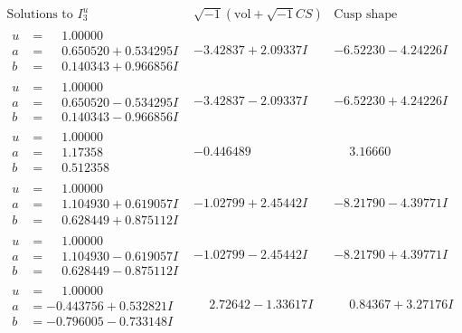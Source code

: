 \documentclass[1p]{elsarticle_modified}
\theoremstyle{definition}
\newcommand{\I}{\sqrt{-1}}
\begin{document}
$$\begin{array}{c|c|c}  
\text{Solutions to }I^u_{3}& \I (\text{vol} + \sqrt{-1}CS) & \text{Cusp shape}\\
 \hline 
\begin{aligned}
u &= \phantom{-}1.00000\phantom{ +0.000000I} \\
a &= \phantom{-}0.650520 + 0.534295 I \\
b &= \phantom{-}0.140343 + 0.966856 I\end{aligned}
 & -3.42837 + 2.09337 I & -6.52230 - 4.24226 I \\ \hline\begin{aligned}
u &= \phantom{-}1.00000\phantom{ +0.000000I} \\
a &= \phantom{-}0.650520 - 0.534295 I \\
b &= \phantom{-}0.140343 - 0.966856 I\end{aligned}
 & -3.42837 - 2.09337 I & -6.52230 + 4.24226 I \\ \hline\begin{aligned}
u &= \phantom{-}1.00000\phantom{ +0.000000I} \\
a &= \phantom{-}1.17358\phantom{ +0.000000I} \\
b &= \phantom{-}0.512358\phantom{ +0.000000I}\end{aligned}
 & -0.446489\phantom{ +0.000000I} & \phantom{-}3.16660\phantom{ +0.000000I} \\ \hline\begin{aligned}
u &= \phantom{-}1.00000\phantom{ +0.000000I} \\
a &= \phantom{-}1.104930 + 0.619057 I \\
b &= \phantom{-}0.628449 + 0.875112 I\end{aligned}
 & -1.02799 + 2.45442 I & -8.21790 - 4.39771 I \\ \hline\begin{aligned}
u &= \phantom{-}1.00000\phantom{ +0.000000I} \\
a &= \phantom{-}1.104930 - 0.619057 I \\
b &= \phantom{-}0.628449 - 0.875112 I\end{aligned}
 & -1.02799 - 2.45442 I & -8.21790 + 4.39771 I \\ \hline\begin{aligned}
u &= \phantom{-}1.00000\phantom{ +0.000000I} \\
a &= -0.443756 + 0.532821 I \\
b &= -0.796005 - 0.733148 I\end{aligned}
 & \phantom{-}2.72642 - 1.33617 I & \phantom{-}0.84367 + 3.27176 I \\ \hline\begin{aligned}

\end{aligned}
\end{array}$$
\end{document}

